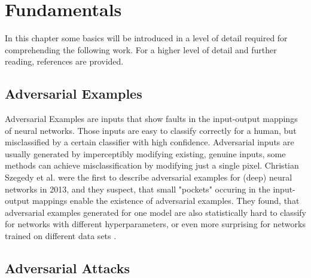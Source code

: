 \documentclass[draft,final]{vutinfth} %
\begin{document}
\chapter{Fundamentals}

In this chapter some basics will be introduced in a level of detail required for comprehending the following work.
For a higher level of detail and further reading, references are provided.

\section{Adversarial Examples}

Adversarial Examples are inputs that show faults in the input-output mappings of neural networks.
Those inputs are easy to classify correctly for a human, but misclassified by a certain classifier with high confidence.
Adversarial inputs are usually generated by imperceptibly modifying existing, genuine inputs, some methods can achieve misclassification by modifying just a single pixel\cite{Jiawei2017}.
Christian Szegedy et al. were the first to describe adversarial examples for (deep) neural networks in 2013, and they suspect, that small "pockets" occuring in the input-output mappings enable the existence of adversarial examples.
They found, that adversarial examples generated for one model are also statistically hard to classify for networks with different hyperparameters, or even more surprising for networks trained on different data sets \cite{Szegedy2013}.

\section{Adversarial Attacks}
\label{section:adv_att}
\end{document}
